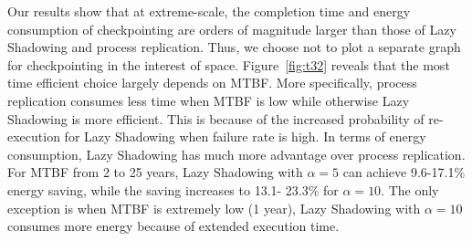 Our results show that at extreme-scale, the completion time and energy consumption of checkpointing are orders of magnitude larger than those of Lazy Shadowing and process replication. Thus, we choose not to plot a separate graph for checkpointing in the interest of space. 
Figure~\ref{fig:t32} reveals that the most time efficient choice largely depends on MTBF. More specifically, process replication consumes less time when MTBF is low while otherwise Lazy Shadowing is more efficient. This is because of the increased probability of re-execution for Lazy Shadowing when failure rate is high. In terms of energy consumption,  Lazy Shadowing has much more advantage over process replication. For MTBF from 2 to 25 years, Lazy Shadowing with $\alpha=5$ can achieve 9.6-17.1\% energy saving, while the saving increases to 13.1- 23.3\% for $\alpha=10$. The only exception is when MTBF is extremely low (1 year), Lazy Shadowing with $\alpha=10$ consumes more energy because of extended execution time.






